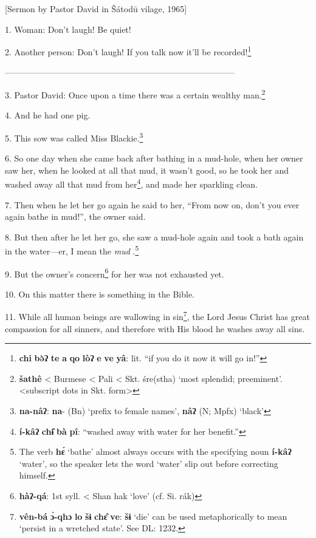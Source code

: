 \setcounter{footnote}{0}

[Sermon by Pastor David in Šátodū vilage, 1965]

1. Woman: Don't laugh! Be quiet!

2. Another person: Don't laugh! If you talk now it'll be recorded!\footnote{\textbf{chi} \textbf{bə̀ʔ} \textbf{te} \textbf{a} \textbf{qo} \textbf{lòʔ} \textbf{e} \textbf{ve} \textbf{yâ}: lit. ``if you do it now it will go in!''}

---------------------------------------------------------------------------------

3. Pastor David: Once upon a time there was a certain wealthy man.\footnote{\textbf{šathê} < Burmese < Pali < Skt. śre(stha) `most splendid; preeminent'. <subscript dots in Skt. form>}

4. And he had one pig.

5. This sow was called Miss Blackie.\footnote{\textbf{na-nâʔ}: \textbf{na}- (Bn) `prefix to female names', \textbf{nâʔ} (N; Mpfx) `black'}

6. So one day when she came back after bathing in a mud-hole, when her owner saw
her, when he looked at all that mud, it wasn't good, so he took her and washed
away all that mud from her\footnote{\textbf{í-kâʔ} \textbf{chɨ̂} \textbf{bà} \textbf{pî}: ``washed away with water for her benefit.''}, and made her sparkling clean.

7. Then when he let her go again he said to her, ``From now on, don't you ever
again bathe in mud!'', the owner said.

8. But then after he let her go, she saw a mud-hole again and took a bath again
in the water---er, I mean the \textit{mud }.\footnote{The verb \textbf{hɛ́} `bathe' almost always occurs with the specifying noun \textbf{í-kâʔ} `water', so the speaker lets the word `water' slip out before correcting himself.}

9. But the owner's concern\footnote{\textbf{hàʔ-qá}: 1st syll. < Shan hak `love' (cf. Si. rák)} for her was not exhausted yet.

10. On this matter there is something in the Bible.

11. While all human beings are wallowing in sin\footnote{\textbf{vên-bá} \textbf{ɔ̀-qhɔ} \textbf{lo} \textbf{šɨ} \textbf{chɛ̂} \textbf{ve}: \textbf{šɨ} `die' can be used metaphorically to mean `persist in a wretched state'. See DL: 1232.}, the Lord Jesus Christ has
great compassion for all sinners, and therefore with His blood he washes away all
sins.

